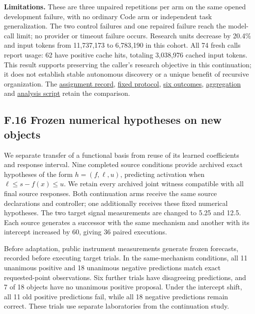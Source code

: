 \documentclass[twoside,11pt]{article}
\begin{document}
\textbf{Limitations.} These are three unpaired repetitions per arm on the same opened development failure, with no ordinary Code arm or independent task generalization. The two control failures and one repaired failure reach the model-call limit; no provider or timeout failure occurs. Research units decrease by 20.4\% and input tokens from 11,737,173 to 6,783,190 in this cohort. All 74 fresh calls report usage: 62 have positive cache hits, totaling 3,038,976 cached input tokens. This result supports preserving the caller's research objective in this continuation; it does not establish stable autonomous discovery or a unique benefit of recursive organization. The \hyperlink{artifact-131}{assignment record}, \hyperlink{artifact-132}{fixed protocol}, \hyperlink{artifact-133}{six outcomes}, \hyperlink{artifact-134}{aggregation} and \hyperlink{artifact-135}{analysis script} retain the comparison.


\subsection*{F.16 Frozen numerical hypotheses on new objects}

We separate transfer of a functional basis from reuse of its learned coefficients and response interval. Nine completed source conditions provide archived exact hypotheses of the form \(h=(f,\ell,u)\), predicting activation when \(\ell\leq s-f(x)\leq u\). We retain every archived joint witness compatible with all final source responses. Both continuation arms receive the same source declarations and controller; one additionally receives these fixed numerical hypotheses. The two target signal measurements are changed to 5.25 and 12.5. Each source generates a successor with the same mechanism and another with its intercept increased by 60, giving 36 paired executions.


Before adaptation, public instrument measurements generate frozen forecasts, recorded before executing target trials. In the same-mechanism conditions, all 11 unanimous positive and 18 unanimous negative predictions match exact requested-point observations. Six further trials have disagreeing predictions, and 7 of 18 objects have no unanimous positive proposal. Under the intercept shift, all 11 old positive predictions fail, while all 18 negative predictions remain correct. These trials use separate laboratories from the continuation study.
\end{document}
